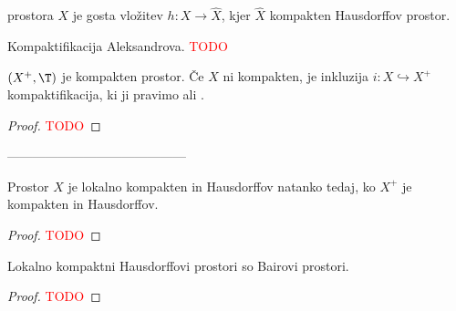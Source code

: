\begin{definicija}
     prostora $X$ je gosta vložitev $h: X \to \widehat{X}$, kjer \(\widehat{X}\) kompakten Hausdorffov prostor.
\end{definicija}

Kompaktifikacija Aleksandrova. \textcolor{red}{TODO}

\begin{izrek}
    $(X^+, \T)$ je kompakten prostor. Če $X$ ni kompakten, je inkluzija $i: X \hookrightarrow X^+$ kompaktifikacija, ki ji pravimo  ali .
\end{izrek}

\begin{proof}
    \textcolor{red}{TODO}
\end{proof}



------------------------------------------
\begin{trditev}
    Prostor $X$ je lokalno kompakten in Hausdorffov natanko tedaj, ko $X^+$ je kompakten in Hausdorffov.
\end{trditev}

\begin{proof}
    \textcolor{red}{TODO}
\end{proof}




\begin{opomba}
    Lokalno kompaktni Hausdorffovi prostori so Bairovi prostori.
\end{opomba}

\begin{proof}
    \textcolor{red}{TODO}
\end{proof}

